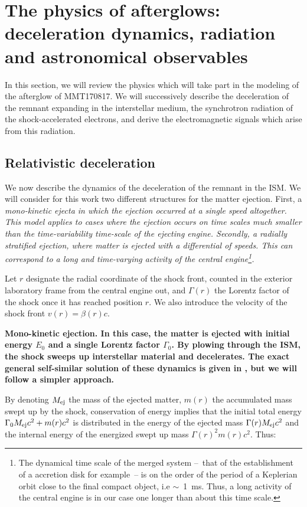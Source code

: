 \section{The physics of afterglows: deceleration dynamics, radiation and astronomical observables}

In this section, we will review the physics which will take part in the modeling of the afterglow of MMT170817. We will successively describe the deceleration of the remnant expanding in the interstellar medium, the synchrotron radiation of the shock-accelerated electrons, and derive the electromagnetic signals which arise from this radiation.

\subsection{Relativistic deceleration}
\label{dynamic}
We now describe the dynamics of the deceleration of the remnant in the ISM. We will consider for this work two different structures for the matter ejection. First, a \it{mono-kinetic ejecta} in which the ejection occurred at a single speed altogether. This model applies to cases where the ejection occurs on time scales much smaller than the time-variability time-scale of the ejecting engine. Secondly, a \it{radially stratified ejection}, where matter is ejected with a differential of speeds. This can correspond to a long and time-varying activity of the central engine\footnote{The dynamical time scale of the merged system --~that of the establishment of a accretion disk for example~-- is on the order of the period of a Keplerian orbit close to the final compact object, i.e $\sim$~1~ms. Thus, a long activity of the central engine is in our case one longer than about this time scale.}.

Let $r$ designate the radial coordinate of the shock front, counted in the exterior laboratory frame from the central engine out, and $\Gamma(r)$ the Lorentz factor of the shock once it has reached position $r$. We also introduce the velocity of the shock front $v(r) = \beta(r)c$.

\bf{Mono-kinetic ejection.} In this case, the matter is ejected with initial energy $E_0$ and a single Lorentz factor $\Gamma_0$. By plowing through the ISM, the shock sweeps up interstellar material and decelerates. The exact general self-similar solution of these dynamics is given in \citet{59}, but we will follow a simpler approach.

By denoting $M_{\rm{ej}}$ the mass of the ejected matter, $m(r)$ the accumulated mass swept up by the shock, conservation of energy implies that the initial total energy $\Gamma_0 M_{\rm{ej}} c^2 + m(r) c^2$ is distributed in the energy of the ejected mass $\Gamma(r) M_{\rm{ej}} c^2$ and the internal energy of the energized swept up mass $\Gamma(r)^2 m(r) c^2$. Thus:

